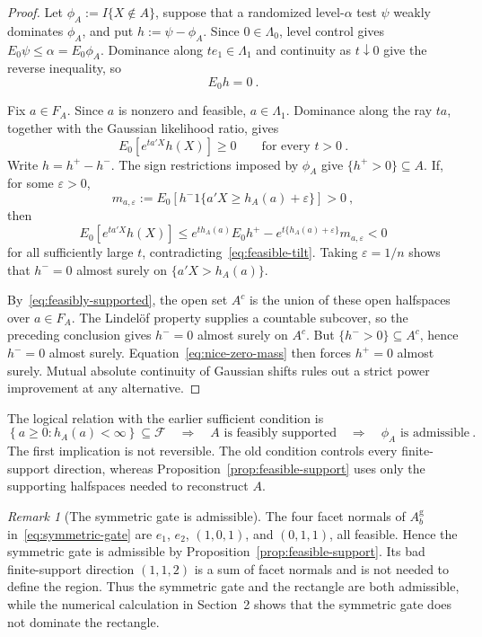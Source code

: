 \documentclass[12pt]{article}
\theoremstyle{remark}
\newtheorem{remark}{Remark}
\begin{document}
\begin{proof}
Let $\phi_A:=I\{X\notin A\}$, suppose that a randomized level-$\alpha$
test $\psi$ weakly dominates $\phi_A$, and put $h:=\psi-\phi_A$.  Since
$0\in\Lambda_0$, level control gives $E_0\psi\le\alpha=E_0\phi_A$.
Dominance along $t e_1\in\Lambda_1$ and continuity as $t\downarrow0$ give
the reverse inequality, so
\begin{equation}\label{eq:nice-zero-mass}
E_0h=0~.
\end{equation}

Fix $a\in F_A$.  Since $a$ is nonzero and feasible, $a\in\Lambda_1$.
Dominance along the ray $ta$, together with the Gaussian likelihood ratio,
gives
\begin{equation}\label{eq:feasible-tilt}
E_0[e^{t a'X}h(X)]\ge0
\qquad\text{for every }t>0~.
\end{equation}
Write $h=h^+-h^-$.  The sign restrictions imposed by $\phi_A$ give
$\{h^+>0\}\subseteq A$.  If, for some $\varepsilon>0$,
\[
m_{a,\varepsilon}
:=
E_0[h^-1\{a'X\ge h_A(a)+\varepsilon\}]>0~,
\]
then
\[
E_0[e^{t a'X}h(X)]
\le
e^{t h_A(a)}E_0h^+
-
e^{t\{h_A(a)+\varepsilon\}}m_{a,\varepsilon}<0
\]
for all sufficiently large $t$, contradicting~\eqref{eq:feasible-tilt}.
Taking $\varepsilon=1/n$ shows that $h^-=0$ almost surely on
$\{a'X>h_A(a)\}$.

By~\eqref{eq:feasibly-supported}, the open set $A^c$ is the union of these
open halfspaces over $a\in F_A$.  The Lindel\"of property supplies a
countable subcover, so the preceding conclusion gives $h^-=0$ almost surely
on $A^c$.  But $\{h^->0\}\subseteq A^c$, hence $h^-=0$ almost surely.
Equation~\eqref{eq:nice-zero-mass} then forces $h^+=0$ almost surely.
Mutual absolute continuity of Gaussian shifts rules out a strict power
improvement at any alternative.
\end{proof}

The logical relation with the earlier sufficient condition is
\[
\left\{a\ge0:h_A(a)<\infty\right\}\subseteq\mathcal F
\quad\Longrightarrow\quad
\text{$A$ is feasibly supported}
\quad\Longrightarrow\quad
\text{$\phi_A$ is admissible}~.
\]
The first implication is not reversible.  The old condition controls every
finite-support direction, whereas Proposition~\ref{prop:feasible-support}
uses only the supporting halfspaces needed to reconstruct $A$.

\begin{remark}[The symmetric gate is admissible]
The four facet normals of $A_b^{\mathrm g}$ in~\eqref{eq:symmetric-gate} are
$e_1$, $e_2$, $(1,0,1)$, and $(0,1,1)$, all feasible.  Hence the symmetric
gate is admissible by Proposition~\ref{prop:feasible-support}.  Its bad
finite-support direction $(1,1,2)$ is a sum of facet normals and is not needed
to define the region.  Thus the symmetric gate and the rectangle are both
admissible, while the numerical calculation in Section~2 shows that the
symmetric gate does not dominate the rectangle.
\end{remark}
\end{document}
